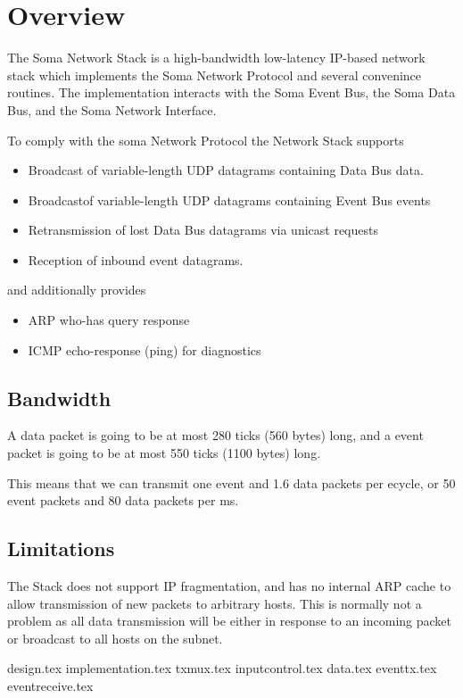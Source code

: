 \section{Overview}

The Soma Network Stack is a high-bandwidth low-latency IP-based
network stack which implements the Soma Network Protocol and several
convenince routines. The implementation interacts with the Soma Event
Bus, the Soma Data Bus, and the Soma Network Interface.

To comply with the soma Network Protocol the Network Stack supports 
\begin{itemize}
\item Broadcast of variable-length UDP datagrams containing Data Bus data. 
\item Broadcastof variable-length UDP datagrams containing Event Bus events
\item Retransmission of lost Data Bus datagrams via unicast requests 
\item Reception of inbound event datagrams. 
\end{itemize}

and additionally provides 
\begin{itemize}
\item ARP who-has query response
\item ICMP echo-response (ping) for diagnostics
\end{itemize}

\subsection{Bandwidth}
A data packet is going to be at most 280 ticks (560 bytes) long, and a
event packet is going to be at most 550 ticks (1100 bytes) long.

This means that we can transmit one event and 1.6 data packets per
ecycle, or 50 event packets and 80 data packets per ms.


\subsection{Limitations}
The Stack does not support IP fragmentation, and has no internal ARP
cache to allow transmission of new packets to arbitrary hosts. This is
normally not a problem as all data transmission will be either in
response to an incoming packet or broadcast to all hosts on the
subnet.

{design.tex}
{implementation.tex}
{txmux.tex}
{inputcontrol.tex}
{data.tex}
{eventtx.tex}
{eventreceive.tex}


